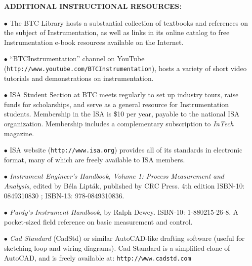 \vskip 10pt

\noindent
{\bf ADDITIONAL INSTRUCTIONAL RESOURCES:} 

\item{$\bullet$} The BTC Library hosts a substantial collection of textbooks and references on the subject of Instrumentation, as well as links in its online catalog to free Instrumentation e-book resources available on the Internet.
\item{$\bullet$} ``BTCInstrumentation'' channel on YouTube ({\tt http://www.youtube.com/BTCInstrumentation}), hosts a variety of short video tutorials and demonstrations on instrumentation.
\item{$\bullet$} ISA Student Section at BTC meets regularly to set up industry tours, raise funds for scholarships, and serve as a general resource for Instrumentation students.  Membership in the ISA is \$10 per year, payable to the national ISA organization.  Membership includes a complementary subscription to {\it InTech} magazine.
\item{$\bullet$} ISA website ({\tt http://www.isa.org}) provides all of its standards in electronic format, many of which are freely available to ISA members.
\item{$\bullet$} {\it Instrument Engineer's Handbook, Volume 1: Process Measurement and Analysis}, edited by B\'ela Lipt\'ak, published by CRC Press.  4th edition ISBN-10: 0849310830 ; ISBN-13: 978-0849310836.
\item{$\bullet$} {\it Purdy's Instrument Handbook}, by Ralph Dewey.  ISBN-10: 1-880215-26-8.  A pocket-sized field reference on basic measurement and control.
\item{$\bullet$} {\it Cad Standard} (CadStd) or similar AutoCAD-like drafting software (useful for sketching loop and wiring diagrams).  Cad Standard is a simplified clone of AutoCAD, and is freely available at: {\tt http://www.cadstd.com}

\vskip 10pt




\vfil 

\eject


